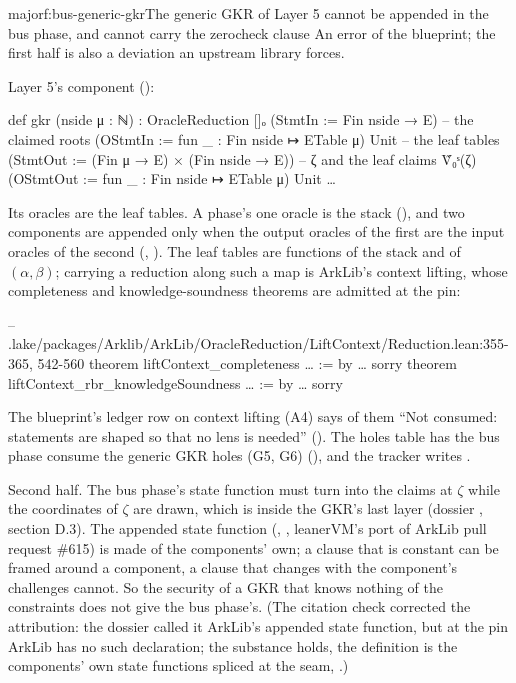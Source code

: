 \begin{finding}{major}{f:bus-generic-gkr}{The generic GKR of Layer 5 cannot be appended in the bus phase, and cannot carry the zerocheck clause}
 An error of the blueprint; the first half is also a deviation an upstream
library forces.

 Layer 5's component ():
\begin{leancode}
def gkr (nside μ : ℕ) : OracleReduction []ₒ
    (StmtIn := Fin nside → E)                                    -- the claimed roots
    (OStmtIn := fun _ : Fin nside ↦ ETable μ) Unit               -- the leaf tables
    (StmtOut := (Fin μ → E) × (Fin nside → E))                   -- ζ and the leaf claims Ṽ₀ˢ(ζ)
    (OStmtOut := fun _ : Fin nside ↦ ETable μ) Unit …
\end{leancode}

Its oracles are the leaf tables. A phase's one oracle is the stack (), and
two components are appended only when the output oracles of the first are the input oracles of
the second (, ). The leaf tables are functions of
the stack and of $(α, β)$; carrying a reduction along such a map is ArkLib's context lifting,
whose completeness and knowledge-soundness theorems are admitted at the pin:
\begin{leancode}
-- .lake/packages/Arklib/ArkLib/OracleReduction/LiftContext/Reduction.lean:355-365, 542-560
theorem liftContext_completeness …  := by … sorry
theorem liftContext_rbr_knowledgeSoundness … := by … sorry
\end{leancode}

The blueprint's ledger row on context lifting (A4) says of them ``Not consumed: statements are
shaped so that no lens is needed'' (). The holes table has the bus phase consume the
generic GKR holes (G5, G6) (), and the tracker writes
.

Second half. The bus phase's state function must turn  into the claims
at $ζ$ while the coordinates of $ζ$ are drawn, which is inside the GKR's last layer (dossier
, section D.3). The appended state function
(, , leanerVM's
port of ArkLib pull request \#615) is made of the components' own; a clause that is constant can
be framed around a component, a clause that changes with the component's challenges cannot. So
the security of a GKR that knows nothing of the constraints does not give the bus phase's. (The
citation check corrected the attribution: the dossier called it ArkLib's appended state
function, but at the pin  ArkLib has no such declaration; the substance holds, the
definition is the components' own state functions spliced at the seam,
.)


\end{finding}
